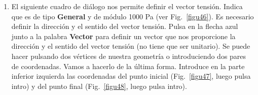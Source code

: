 \begin{enumerate}
\begin{figure}[H]
  \end{figure}
\item El siguiente cuadro de diálogo nos permite definir el vector
  tensión. Indica que es de tipo \textbf{General} y de módulo 1000 Pa
  (ver Fig.~\ref{figu46}). Es necesario definir la dirección y el
  sentido del vector tensión. Pulsa en la flecha azul junto a la
  palabra \textbf{Vector} para definir un vector que nos proporcione
  la dirección y el sentido del vector tensión (no tiene que ser
  unitario). Se puede hacer pulsando dos vértices de nuestra geometría
  o introduciendo dos pares de coordenadas. Vamos a hacerlo de la
  última forma. Introduce en la parte inferior izquierda las
  coordenadas del punto inicial (Fig.~\ref{figu47}, luego pulsa intro)
  y del punto final (Fig.~\ref{figu48}, luego pulsa intro).


\end{enumerate}
